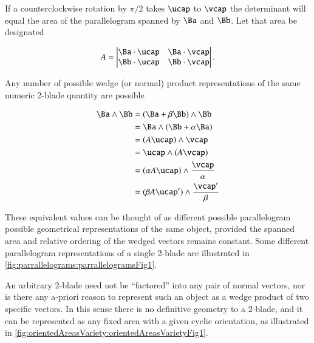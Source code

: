 If a counterclockwise rotation by \( \pi/2 \) takes \( \ucap \) to \( \vcap \) the determinant will equal the area of the parallelogram spanned by \( \Ba \) and \( \Bb \).  Let that area be designated

\begin{dmath}\label{eqn:wedgeProductArea:1920}
A =
\begin{vmatrix}
   \Ba \cdot \ucap & \Ba \cdot \vcap \\
   \Bb \cdot \ucap & \Bb \cdot \vcap
\end{vmatrix}.
\end{dmath}

Any number of possible wedge (or normal) product representations of the same numeric 2-blade quantity are possible

\begin{dmath}\label{eqn:wedgeProductArea:1940}
\begin{aligned}
\Ba \wedge \Bb
&= (\Ba + \beta \Bb ) \wedge \Bb \\
&= \Ba \wedge ( \Bb + \alpha \Ba ) \\
&= (A \ucap) \wedge \vcap \\
&= \ucap \wedge (A \vcap) \\
&= (\alpha A \ucap) \wedge \frac{\vcap}{\alpha} \\
&= (\beta A \ucap') \wedge \frac{\vcap'}{\beta} \\
\end{aligned}
\end{dmath}

These equivalent values can be thought of as different possible parallelogram possible geometrical representations of the same object, provided the spanned area and relative ordering of the wedged vectors remains constant.
Some different parallelogram representations of a single 2-blade are illustrated in \cref{fig:parrallelograms:parrallelogramsFig1}.


An arbitrary 2-blade need not be ``factored'' into any pair of normal vectors, nor is there any a-priori reason to represent such an object as a wedge product of two specific vectors.  In this sense there is no definitive geometry to a 2-blade, and it can be represented as any fixed area with a given cyclic orientation, as
illustrated in \cref{fig:orientedAreasVariety:orientedAreasVarietyFig1}.

